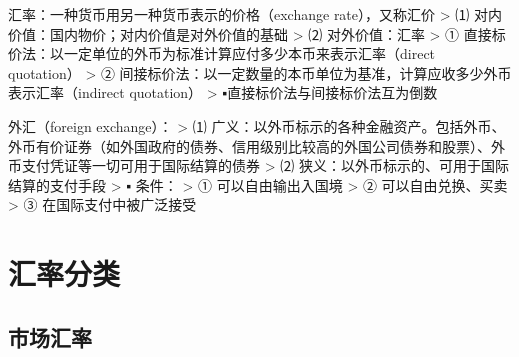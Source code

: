 \documentclass[12pt]{book}
\begin{document}
汇率：一种货币用另一种货币表示的价格（exchange rate），又称汇价
> ⑴	对内价值：国内物价；对内价值是对外价值的基础  
> ⑵	对外价值：汇率  
>   ① 直接标价法：以一定单位的外币为标准计算应付多少本币来表示汇率（direct quotation）  
>   ② 间接标价法：以一定数量的本币单位为基准，计算应收多少外币表示汇率（indirect quotation）
> ▪直接标价法与间接标价法互为倒数


外汇（foreign exchange）：
> ⑴ 广义：以外币标示的各种金融资产。包括外币、外币有价证券（如外国政府的债券、信用级别比较高的外国公司债券和股票）、外币支付凭证等一切可用于国际结算的债券  
> ⑵ 狭义：以外币标示的、可用于国际结算的支付手段  
> ▪ 条件：  
> ① 可以自由输出入国境  
> ② 可以自由兑换、买卖  
> ③ 在国际支付中被广泛接受










\section{汇率分类}







\subsection{市场汇率}
\end{document}
